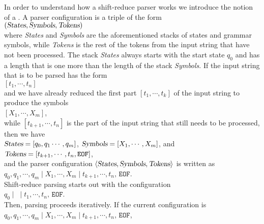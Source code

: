 In order to understand how a shift-reduce parser works we introduce the notion of a
.  A parser configuration is a triple of the form
\\[0.2cm]
\hspace*{1.3cm}
$(\textsl{States}, \textsl{Symbols}, \textsl{Tokens})$
\\[0.2cm]
where \textsl{States} and \textsl{Symbols} are the aforementioned stacks of states and grammar symbols, while
\textsl{Tokens} is the rest of the 
tokens from the input string that have not been processed.  The stack \textsl{States} always starts with the
start state $q_0$ and has a length that is one more than the length of the stack \textsl{Symbols}.
If the input string that is to be parsed has the form
\\[0.2cm]
\hspace*{1.3cm}
$[t_1, \cdots,t_n]$
\\[0.2cm]
and we have already reduced the first part $[t_1, \cdots,t_k]$ of the input string to produce the symbols 
\\[0.2cm]
\hspace*{1.3cm}
$[X_1,\cdots, X_m]$,
\\[0.2cm]
while $[t_{k+1},\cdots,t_n]$ is the part of the input string that still needs to be processed, then we have
\\[0.2cm]
\hspace*{1.3cm}
$\textsl{States} = [q_0,q_1\cdots, q_m]$, \quad $\textsl{Symbols} = [X_1,\cdots, X_m]$,
\quad and \quad $\textsl{Tokens} = [t_{k+1}, \cdots, t_n, \mathtt{EOF}]$,
\\[0.2cm]
and the parser configuration $\langle \textsl{States}, \textsl{Symbols}, \textsl{Tokens} \rangle$ is written as
\\[0.2cm]
\hspace*{1.3cm}
$q_0, q_1, \cdots, q_m \mid X_1, \cdots, X_m \mid t_{k+1}, \cdots, t_n,\, \mathtt{EOF}$.
\\[0.2cm]
Shift-reduce parsing starts out with the configuration
\\[0.2cm]
\hspace*{1.3cm}
$q_0 \mid \;  \mid t_{1}, \cdots, t_n,\, \mathtt{EOF}$.
\\[0.2cm] 
Then, parsing proceeds iteratively.  If the current configuration is
\\[0.2cm]
\hspace*{1.3cm}
$q_0, q_1, \cdots, q_m \mid X_1, \cdots, X_m \mid t_{k+1}, \cdots, t_n, \,\mathtt{EOF}$,
\\[0.2cm]

